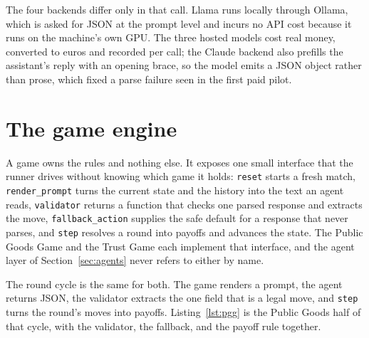 The four backends differ only in that call. Llama runs locally through Ollama,
which is asked for JSON at the prompt level and incurs no API cost because it runs
on the machine's own GPU. The three hosted models cost real money, converted to
euros and recorded per call; the Claude backend also prefills the assistant's
reply with an opening brace, so the model emits a JSON object rather than prose,
which fixed a parse failure seen in the first paid pilot.

\section{The game engine}
\label{sec:games}

A game owns the rules and nothing else. It exposes one small interface that the
runner drives without knowing which game it holds: \texttt{reset} starts a fresh
match, \texttt{render\_prompt} turns the current state and the history into the text
an agent reads, \texttt{validator} returns a function that checks one parsed response
and extracts the move, \texttt{fallback\_action} supplies the safe default for a
response that never parses, and \texttt{step} resolves a round into payoffs and
advances the state. The Public Goods Game and the Trust Game each implement that
interface, and the agent layer of Section~\ref{sec:agents} never refers to either by
name.

The round cycle is the same for both. The game renders a prompt, the agent returns
JSON, the validator extracts the one field that is a legal move, and \texttt{step}
turns the round's moves into payoffs. Listing~\ref{lst:pgg} is the Public Goods half
of that cycle, with the validator, the fallback, and the payoff rule together.

